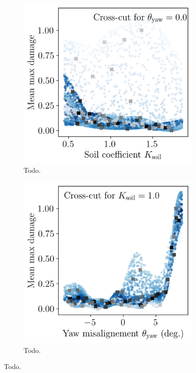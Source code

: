\begin{figure}
    \centering
    \begin{subfigure}[b]{0.48\linewidth}
        \includegraphics[width=\linewidth]{./part3/figures/OWT/dam_vs_soil_surrogate.png}
        \caption{Todo.}
    \end{subfigure}
    \begin{subfigure}[b]{0.48\linewidth}
        \includegraphics[width=\linewidth]{./part3/figures/OWT/dam_vs_yaw_surrogate.png}
        \caption{Todo.}
    \end{subfigure}
    \label{fig:owt_surrogate}
    \caption{Todo.}
\end{figure}

